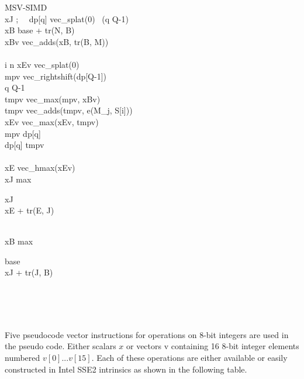 \begin{pseudocode}{MSV-SIMD}{ }
\label{MSV-SIMD}
\\
xJ ; \ \  dp[q] \GETS vec\_splat(0) \  (q  \TO Q-1)\\
xB \GETS base + tr(N, B)\\
xBv \GETS vec\_adds(xB, tr(B, M))\\
\\
\FOR i  \TO n \DO
\BEGIN
  xEv \GETS vec\_splat(0)\\
  mpv \GETS vec\_rightshift(dp[Q-1])\\
  \FOR q  \TO Q-1 \DO
  \BEGIN
    \\
    tmpv \GETS vec\_max(mpv, xBv)\\
    tmpv \GETS vec\_adds(tmpv, e(M_j, S[i]))\\
    xEv \GETS vec\_max(xEv, tmpv)\\
    mpv \GETS dp[q]\\
    dp[q] \GETS tmpv\\
  \END\\
  xE \GETS vec\_hmax(xEv)\\
  xJ \GETS max 
  \begin{cases}
   xJ\\
   xE + tr(E, J)
  \end{cases}\\
  xB \GETS max 
  \begin{cases}
   base\\
   xJ + tr(J, B)
  \end{cases}\\
\END\\
\\
\end{pseudocode}

Five pseudocode vector instructions for operations on 8-bit integers are used in the pseudo code. Either scalars $x$ or vectors v containing 16 8-bit integer elements numbered $v[0]...v[15]$. Each of these operations are either available or easily constructed in Intel SSE2 intrinsics as shown in the following table.

